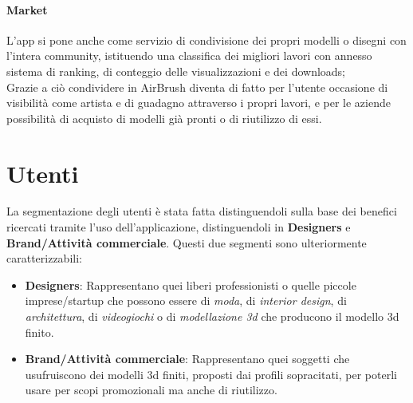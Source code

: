 \documentclass[11pt,fleqn]{book} %
\begin{document}
\paragraph{Market} L'app si  pone anche come servizio di condivisione dei propri modelli o disegni con l'intera community, istituendo una classifica dei migliori lavori con annesso sistema di ranking, di conteggio delle visualizzazioni e dei downloads;\\
Grazie a ciò condividere in AirBrush diventa di fatto per l'utente occasione di visibilità come artista e di guadagno attraverso i propri lavori, e per le aziende possibilità di acquisto di modelli già pronti o di riutilizzo di essi.



\section{Utenti}
La segmentazione degli utenti è stata fatta distinguendoli sulla base dei benefici ricercati tramite l'uso dell'applicazione, distinguendoli in \textbf{Designers} e \textbf{Brand/Attività commerciale}. Questi due segmenti sono ulteriormente caratterizzabili:
\begin{itemize}
\item \textbf{Designers}: Rappresentano quei liberi professionisti o quelle piccole imprese/startup che possono essere di \emph{moda}, di\emph{ interior design}, di \emph{architettura}, di \emph{videogiochi} o di\emph{ modellazione 3d} che producono il modello 3d finito.
\item \textbf{Brand/Attività commerciale}: Rappresentano quei soggetti che usufruiscono dei modelli 3d finiti, proposti dai profili sopracitati, per poterli usare per scopi promozionali ma anche di riutilizzo.
\end{itemize}



\newpage
\end{document}
